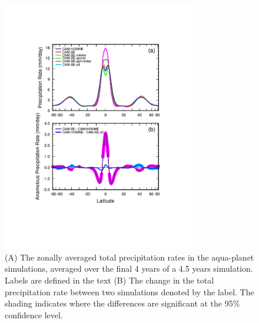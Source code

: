 \documentclass{agujournal}
\begin{document}
\begin{figure}[h]
\centering
\includegraphics[width=20pc]{figs/dzonal_prect.pdf}
\caption{(A) The zonally averaged total precipitation rates in the aqua-planet simulations, averaged over the final 4 years of a 4.5 years simulation. Labels are defined in the text (B) The change in the total precipitation rate between two simulations denoted by the label. The shading indicates where the differences are significant at the 95\% confidence level.}
\label{fig:dzonal}
\end{figure}

%
\end{document}
